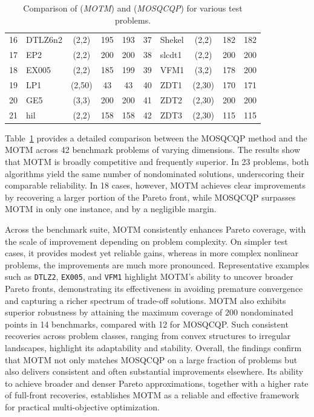 \documentclass[amsa]{ipart}
\theoremstyle{plain}
\numberwithin{equation}{section}
\begin{document}
\begin{table}[!htbp]
{\begin{tabular}{|c|l|c|c|c|c|l|c|c|c|}
16	&	DTLZ6n2	&	(2,2)	&	195	&	193	&	37	&	Shekel	&	(2,2)	&	182	&	182	\\
17	&	EP2	&	(2,2)	&	200	&	200	&	38	&	slcdt1	&	(2,2)	&	200	&	200	\\
18	&	EX005	&	(2,2)	&	185	&	199	&	39	&	VFM1	&	(3,2)	&	178	&	200	\\
19	&	LP1	&	(2,50)	&	43	&	43	&	40	&	ZDT1	&	(2,30)	&	170	&	171	\\
20	&	GE5	&	(3,3)	&	200	&	200	&	41	&	ZDT2	&	(2,30)	&	200	&	200	\\
21	&	hil	&	(2,2)	&	158	&	158	&	42	&	ZDT3	&	(2,30)	&	115	&	115	\\\hline
\end{tabular}
 }
\caption{Comparison of (\textit{MOTM}) and (\textit{MOSQCQP}) for various test problems.}
\label{tab:table_1}
\end{table}
Table~\ref{tab:table_1} provides a detailed comparison between the MOSQCQP method and the MOTM across 42 benchmark problems of varying dimensions. The results show that MOTM is broadly competitive and frequently superior. In 23 problems, both algorithms yield the same number of nondominated solutions, underscoring their comparable reliability. In 18 cases, however, MOTM achieves clear improvements by recovering a larger portion of the Pareto front, while MOSQCQP surpasses MOTM in only one instance, and by a negligible margin.  

Across the benchmark suite, MOTM consistently enhances Pareto coverage, with the scale of improvement depending on problem complexity. On simpler test cases, it provides modest yet reliable gains, whereas in more complex nonlinear problems, the improvements are much more pronounced. Representative examples such as \texttt{DTLZ2}, \texttt{EX005}, and \texttt{VFM1} highlight MOTM’s ability to uncover broader Pareto fronts, demonstrating its effectiveness in avoiding premature convergence and capturing a richer spectrum of trade-off solutions. MOTM also exhibits superior robustness by attaining the maximum coverage of $200$ nondominated points in 14 benchmarks, compared with 12 for MOSQCQP. Such consistent recoveries across problem classes, ranging from convex structures to irregular landscapes, highlight its adaptability and stability. Overall, the findings confirm that MOTM not only matches MOSQCQP on a large fraction of problems but also delivers consistent and often substantial improvements elsewhere. Its ability to achieve broader and denser Pareto approximations, together with a higher rate of full-front recoveries, establishes MOTM as a reliable and effective framework for practical multi-objective optimization.
\end{document}
